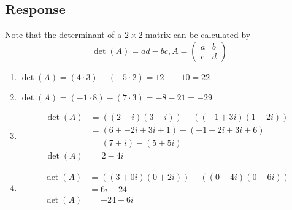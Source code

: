 \documentclass[13pt]{article}
\begin{document}
    \subsection*{Response}
    Note that the determinant of a $2 \times 2$ matrix can be calculated by
    \[\det(A) = ad - bc,
      A = \begin{pmatrix}
        a & b \\
        c & d
      \end{pmatrix}
    \]
    \begin{enumerate}[label=(\alph*),leftmargin=*]
    \item $\det(A) = (4 \cdot 3) - (-5 \cdot 2) = 12 - -10 = 22$
    \item $\det(A) = (-1 \cdot 8) - (7 \cdot 3) = -8 - 21 = -29$
    \item
      \begin{align*}
        \det(A) &= ((2 + i)(3 - i)) - ((-1 + 3i)(1 - 2i)) \\
            &= (6 + -2i + 3i + 1) - (-1 + 2i + 3i + 6) \\
            &= (7 + i) - (5 + 5i) \\
        \det(A) &= 2 - 4i
      \end{align*}
    \item
      \begin{align*}
        \det(A) &= ((3 + 0i)(0 + 2i)) - ((0 + 4i)(0 -6i)) \\
            &= 6i - 24 \\
        \det(A) &= -24 + 6i
      \end{align*}
    \end{enumerate}
    
    \newpage
\end{document}
